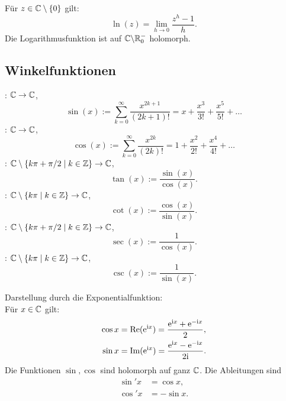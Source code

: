Für $z\in\mathbb C\setminus\{0\}$ gilt:
\begin{equation}
\ln(z)=\lim_{h\to 0}\frac{z^h-1}{h}.
\end{equation}
Die Logarithmusfunktion ist auf $\mathbb C{\setminus}\mathbb R_0^-$ holomorph.


\subsection{Winkelfunktionen}
\begin{definition}[Winkelfunktionen]\mbox{}\newline
{}: $\mathbb C\to\mathbb C$,
\begin{equation}
\sin(x) := \sum_{k=0}^\infty \frac{x^{2k+1}}{(2k+1)!}
= x+\frac{x^3}{3!}+\frac{x^5}{5!}+\ldots
\end{equation}
: $\mathbb C\to\mathbb C$,
\begin{equation}
\cos(x) := \sum_{k=0}^\infty \frac{x^{2k}}{(2k)!}
= 1+\frac{x^2}{2!}+\frac{x^4}{4!}+\ldots
\end{equation}
: $\mathbb C\setminus\{k\pi+\pi/2\mid k\in\mathbb Z\}\to\mathbb C$,
\begin{equation}
\tan(x) := \frac{\sin(x)}{\cos(x)}.
\end{equation}
: $\mathbb C\setminus\{k\pi\mid k\in\mathbb Z\}\to\mathbb C$,
\begin{equation}
\cot(x) := \frac{\cos(x)}{\sin(x)}.
\end{equation}
: $\mathbb C\setminus\{k\pi+\pi/2\mid k\in\mathbb Z\}\to\mathbb C$,
\begin{equation}
\sec(x) := \frac{1}{\cos(x)}.
\end{equation}
: $\mathbb C\setminus\{k\pi\mid k\in\mathbb Z\}\to\mathbb C$,
\begin{equation}
\csc(x) := \frac{1}{\sin(x)}.
\end{equation}
\end{definition}
\noindent
Darstellung durch die Exponentialfunktion:\\
Für $x\in\mathbb C$ gilt:
\begin{align}
\cos x &= \operatorname{Re}(\mathrm e^{\mathrm i x}) = \frac{\mathrm e^{\mathrm i x}+\mathrm e^{-\mathrm i x}}{2},\\
\sin x &= \operatorname{Im}(\mathrm e^{\mathrm i x}) = \frac{\mathrm e^{\mathrm i x}-\mathrm e^{-\mathrm i x}}{2\mathrm i}.
\end{align}
Die Funktionen $\sin, \cos$ sind holomorph auf ganz $\mathbb C$.
Die Ableitungen sind
\begin{align}
\sin' x &= \cos x,\\
\cos' x &= -\sin x.
\end{align}

